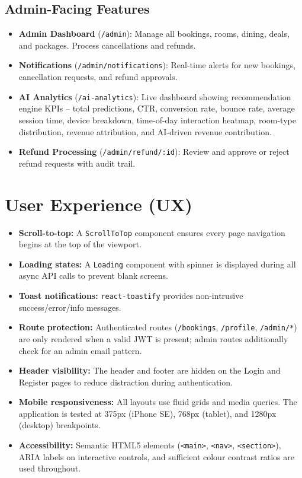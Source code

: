 \documentclass[12pt,a4paper]{report}
\begin{document}
\subsection*{Admin-Facing Features}
\begin{itemize}[leftmargin=*, label=\textbullet]
  \item \textbf{Admin Dashboard} (\texttt{/admin}): Manage all bookings, rooms, dining, deals, and packages. Process cancellations and refunds.
  \item \textbf{Notifications} (\texttt{/admin/notifications}): Real-time alerts for new bookings, cancellation requests, and refund approvals.
  \item \textbf{AI Analytics} (\texttt{/ai-analytics}): Live dashboard showing recommendation engine KPIs -- total predictions, CTR, conversion rate, bounce rate, average session time, device breakdown, time-of-day interaction heatmap, room-type distribution, revenue attribution, and AI-driven revenue contribution.
  \item \textbf{Refund Processing} (\texttt{/admin/refund/:id}): Review and approve or reject refund requests with audit trail.
\end{itemize}

\section{User Experience (UX)}

\begin{itemize}[leftmargin=*, label=\textbullet]
  \item \textbf{Scroll-to-top:} A \texttt{ScrollToTop} component ensures every page navigation begins at the top of the viewport.
  \item \textbf{Loading states:} A \texttt{Loading} component with spinner is displayed during all async API calls to prevent blank screens.
  \item \textbf{Toast notifications:} \texttt{react-toastify} provides non-intrusive success/error/info messages.
  \item \textbf{Route protection:} Authenticated routes (\texttt{/bookings}, \texttt{/profile}, \texttt{/admin/*}) are only rendered when a valid JWT is present; admin routes additionally check for an admin email pattern.
  \item \textbf{Header visibility:} The header and footer are hidden on the Login and Register pages to reduce distraction during authentication.
  \item \textbf{Mobile responsiveness:} All layouts use fluid grids and media queries. The application is tested at 375px (iPhone SE), 768px (tablet), and 1280px (desktop) breakpoints.
  \item \textbf{Accessibility:} Semantic HTML5 elements (\texttt{<main>}, \texttt{<nav>}, \texttt{<section>}), ARIA labels on interactive controls, and sufficient colour contrast ratios are used throughout.
\end{itemize}
\end{document}
